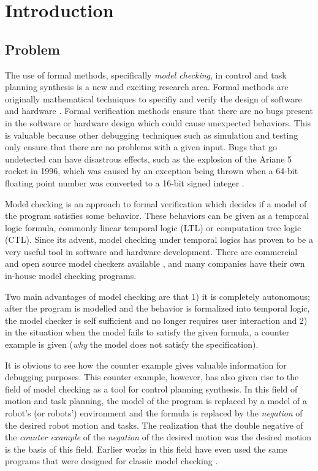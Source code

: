 \chapter{Introduction}
\section{Problem}
The use of formal methods, specifically \textit{model checking}, in control and task planning synthesis is a new and exciting research area. Formal methods are originally mathematical techniques to specifiy and verify the design of software and hardware \cite{clarke96}. Formal verification methods ensure that there are no bugs present in the software or hardware design which could cause unexpected behaviors. This is valuable because other debugging techniques such as simulation and testing only ensure that there are no problems with a given input. Bugs that go undetected can have disastrous effects, such as the explosion of the Ariane 5 rocket in 1996, which was caused by an exception being thrown when a 64-bit floating point number was converted to a 16-bit signed integer \cite{clarke99}. 

Model checking is an approach to formal verification which decides if a model of the program satisfies some behavior. These behaviors can be given as a temporal logic formula, commonly linear temporal logic (LTL) or computation tree logic (CTL). Since its advent, model checking under temporal logics has proven to be a very useful tool in software and hardware development. There are commercial and open source model checkers available \cite{holzmann03}, \cite{cimatti02} and many companies have their own in-house model checking programs. 

Two main advantages of model checking are that 1) it is completely autonomous; after the program is modelled and the behavior is formalized into temporal logic, the model checker is self sufficient and no longer requires user interaction and 2) in the situation when the model fails to satisfy the given formula, a counter example is given (\textit{why} the model does not satisfy the specification). 

It is obvious to see how the counter example gives valuable information for debugging purposes. This counter example, however, has also given rise to the field of model checking as a tool for control planning synthesis. In this field of motion and task planning, the model of the program is replaced by a model of a robot's (or robots') environment and the formula is replaced by the \textit{negation} of the desired robot motion and tasks. The realization that the double negative of the \textit{counter example} of the \textit{negation} of the desired motion was the desired motion is the basis of this field. Earlier works in this field have even used the same programs that were designed for classic model checking \cite{fainekos05}. 

